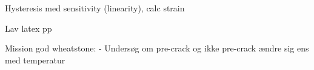 Hysteresis med sensitivity (linearity), calc strain



Lav latex pp



Mission god wheatstone:
    - Undersøg om pre-crack og ikke pre-crack ændre sig ens med temperatur